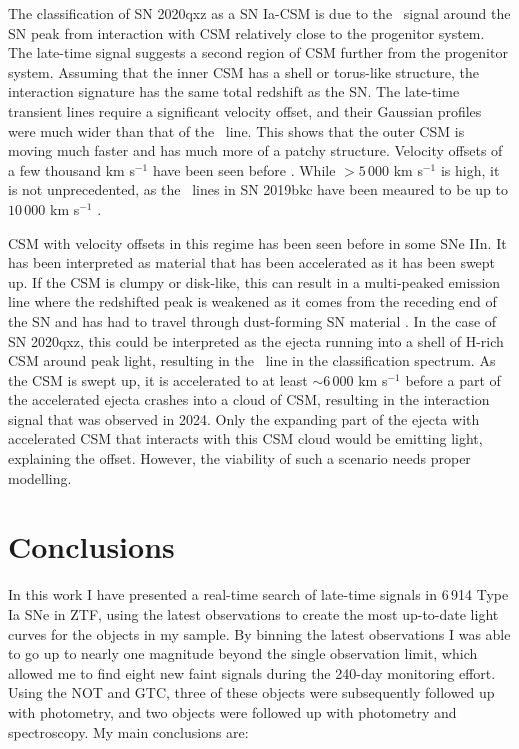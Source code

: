 \documentclass[a4paper,oneside,12pt, class=Latex/Classes/PhDthesisPSnPDF, crop=false]{standalone}
\begin{document}
The classification of SN 2020qxz as a SN Ia-CSM is due to the \Halpha\ signal around the SN peak from interaction with CSM relatively close to the progenitor system. The late-time signal suggests a second region of CSM further from the progenitor system. Assuming that the inner CSM has a shell or torus-like structure, the interaction signature has the same total redshift as the SN. The late-time transient lines require a significant velocity offset, and their Gaussian profiles were much wider than that of the \Halpha\ line. This shows that the outer CSM is moving much faster and has much more of a patchy structure. Velocity offsets of a few thousand km s$^{-1}$ have been seen before \citep{Maeda_exp_asymetry, Maguire_opt_NIR}. While $>5\,000$ km s$^{-1}$ is high, it is not unprecedented, as the \CaII\ lines in SN 2019bkc have been meaured to be up to $10\,000$ km s$^{-1}$ \citep{2019bkc_Chen, 2019bkc_Prentice}.

CSM with velocity offsets in this regime has been seen before in some SNe IIn. It has been interpreted as material that has been accelerated as it has been swept up. If the CSM is clumpy or disk-like, this can result in a multi-peaked emission line where the redshifted peak is weakened as it comes from the receding end of the SN and has had to travel through dust-forming SN material \citep{1998S_aspherical_CSM, 1998S_late-time, PTF11iqb}. In the case of SN 2020qxz, this could be interpreted as the ejecta running into a shell of H-rich CSM around peak light, resulting in the \Halpha\ line in the classification spectrum. As the CSM is swept up, it is accelerated to at least $\sim6\,000$ km s$^{-1}$ before a part of the accelerated ejecta crashes into a cloud of CSM, resulting in the interaction signal that was observed in 2024. Only the expanding part of the ejecta with accelerated CSM that interacts with this CSM cloud would be emitting light, explaining the offset. However, the viability of such a scenario needs proper modelling.


\section{Conclusions}
\label{conclusion}
In this work I have presented a real-time search of late-time signals in 6\,914 Type Ia SNe in ZTF, using the latest observations to create the most up-to-date light curves for the objects in my sample. By binning the latest observations I was able to go up to nearly one magnitude beyond the single observation limit, which allowed me to find eight new faint signals during the 240-day monitoring effort. Using the NOT and GTC, three of these objects were subsequently followed up with photometry, and two objects were followed up with photometry and spectroscopy. My main conclusions are:
\end{document}
